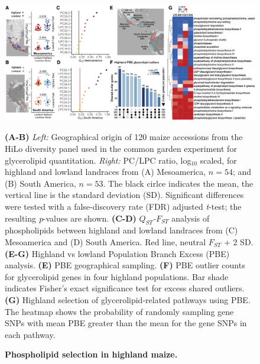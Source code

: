 \begin{figure}[htp]
\includegraphics[width=\linewidth]{Chapter-1/figs/Fig_1.png}
\caption[Phospholipid selection in highland maize.]{\textbf{Phospholipid selection in highland maize.}} 
\textbf{(A-B)} \textit{Left:} Geographical origin of 120 maize accessions from the HiLo diversity panel used in the common garden experiment for glycerolipid quantitation.
\textit{Right:} PC/LPC ratio, log$_{10}$ scaled, for highland and lowland landraces from (A) Mesoamerica, $n=54$; and (B) South America, $n=53$. The black cirlce indicates the mean, the vertical line is the standard deviation (SD). Significant differences were tested with a false-discovery rate (FDR) adjusted \textit{t}-test; the resulting \textit{p}-values are shown.
\textbf{(C-D)}
\textit{$Q_{ST}$-$F_{ST}$} analysis of phospholipids between highland and lowland landraces from (C) Mesoamerica  and (D) South America. 
Red line, neutral $F_{ST}$ + 2 SD.
\textbf{(E-G)} Highland vs lowland Population Branch Excess (PBE) analysis.
\textbf{(E)} PBE geographical sampling.
\textbf{(F)} PBE outlier counts for glycerolipid genes in four highland populations.
Bar shade indicates Fisher's exact significance test for excess shared outliers. 
\textbf{(G)} Highland selection of glycerolipid-related pathways using PBE. The heatmap shows the probability of randomly sampling gene SNPs with mean PBE greater than the mean for the gene SNPs in each pathway.
\label{Fig1}
\end{figure}



